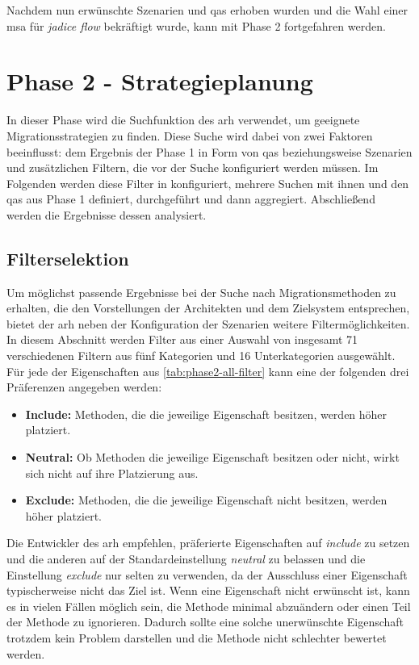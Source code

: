 Nachdem nun erwünschte Szenarien und \glspl{qa} erhoben wurden und die Wahl einer \gls{msa} für \emph{jadice flow} bekräftigt wurde, kann mit Phase 2 fortgefahren werden.

\section{Phase 2 - Strategieplanung}
\label{sec:durchführung-phase2}

In dieser Phase wird die Suchfunktion des \gls{arh} verwendet, um geeignete Migrationsstrategien zu finden.
Diese Suche wird dabei von zwei Faktoren beeinflusst: dem Ergebnis der Phase 1 in Form von \glspl{qa} beziehungsweise Szenarien und zusätzlichen Filtern, die vor der Suche konfiguriert werden müssen.
Im Folgenden werden diese Filter in konfiguriert, mehrere Suchen mit ihnen und den \glspl{qa} aus Phase 1 definiert, durchgeführt und dann aggregiert.
Abschließend werden die Ergebnisse dessen analysiert.

\subsection{Filterselektion}
\label{sec:filterselektion}

Um möglichst passende Ergebnisse bei der Suche nach Migrationsmethoden zu erhalten, die den Vorstellungen der Architekten und dem Zielsystem entsprechen, bietet der \gls{arh} neben der Konfiguration der Szenarien weitere Filtermöglichkeiten.
In diesem Abschnitt werden Filter aus einer Auswahl von insgesamt  71 verschiedenen Filtern aus fünf Kategorien und 16 Unterkategorien ausgewählt.
Für jede der Eigenschaften aus \cref{tab:phase2-all-filter} kann eine der folgenden drei Präferenzen angegeben werden:
\begin{itemize}
	\item \textbf{Include:} Methoden, die die jeweilige Eigenschaft besitzen, werden höher platziert.
	\item \textbf{Neutral:} Ob Methoden die jeweilige Eigenschaft besitzen oder nicht, wirkt sich nicht auf ihre Platzierung aus.
	\item \textbf{Exclude:} Methoden, die die jeweilige Eigenschaft nicht besitzen, werden höher platziert.
\end{itemize}



Die Entwickler des \gls{arh} empfehlen, präferierte Eigenschaften auf \emph{include} zu setzen und die anderen auf der Standardeinstellung \emph{neutral} zu belassen und die Einstellung \emph{exclude} nur selten zu verwenden, da der Ausschluss einer Eigenschaft typischerweise nicht das Ziel ist.
Wenn eine Eigenschaft nicht erwünscht ist, kann es in vielen Fällen möglich sein, die Methode minimal abzuändern oder einen Teil der Methode zu ignorieren.
Dadurch sollte eine solche unerwünschte Eigenschaft trotzdem kein Problem darstellen und die Methode nicht schlechter bewertet werden.

